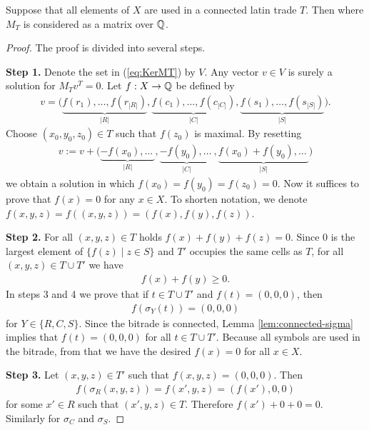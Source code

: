 \begin{lem}
Suppose that all elements of $X$ are used in a connected latin trade $T$. Then
%
where $M_T$ is considered as a matrix over $\mathbb Q$.
\end{lem}
\begin{proof}
The proof is divided into several steps.

%
%
\item \textbf{Step 1.}
Denote the set in (\ref{eq:KerMT}) by $V$. Any vector $v \in V$ is surely a solution for $M_Tv^T = 0$. Let $f:X \rightarrow \mathbb Q$ be defined by
\begin{align}
	v = \big(\underbrace{f(r_1), \dots, f(r_{|R|})}_{|R|}, \underbrace{f(c_1), \dots, f(c_{|C|})}_{|C|}, \underbrace{f(s_1), \dots, f(s_{|S|})}_{|S|}\big).
\end{align}
Choose $(x_0, y_0, z_0) \in T$ such that $f(z_0)$ is maximal. By resetting
\begin{align}
	v := v+\big(\underbrace{-f(x_0), \dots\ }_{|R|}, \underbrace{-f(y_0), \dots\ }_{|C|},\underbrace{f(x_0)+f(y_0), \dots\ }_{|S|}\big)
\end{align}
we obtain a solution in which $f(x_0) = f(y_0) = f(z_0) = 0$. Now it suffices to prove that $f(x) = 0$ for any $x \in X$. To shorten notation, we denote $f(x,y,z) = f((x,y,z)) = (f(x),f(y),f(z))$.

%
%
\item \textbf{Step 2.}
For all $(x,y,z) \in T$ holds $f(x)+f(y)+f(z)=0$. Since $0$ is the largest element of $\{f(z) \mid z \in S\}$ and $T'$ occupies the same cells as $T$, for all $(x,y,z) \in T \cup T'$ we have
\begin{align}
	f(x) + f(y) \geq 0.
\end{align}
In steps 3 and 4 we prove that if $t \in T\cup T'$ and $f(t) = (0,0,0)$, then
\begin{align}
	f(\sigma_Y(t)) = (0,0,0)
\end{align}
for $Y \in \{R, C, S\}$. Since the bitrade is connected, Lemma \ref{lem:connected-sigma} implies that $f(t) = (0,0,0)$ for all $t \in T \cup T'$. Because all symbols are used in the bitrade, from that we have the desired $f(x) = 0$ for all $x \in X$.

%
%
\item \textbf{Step 3.}
Let $(x,y,z) \in T'$ such that $f(x,y,z) = (0,0,0)$. Then
\begin{align}
	f(\sigma_R(x,y,z)) = f(x',y,z) = (f(x'), 0, 0)
\end{align}
for some $x' \in R$ such that $(x',y,z) \in T$. Therefore $f(x') + 0 + 0 = 0$. Similarly for $\sigma_C$ and $\sigma_S$.


\end{proof}
